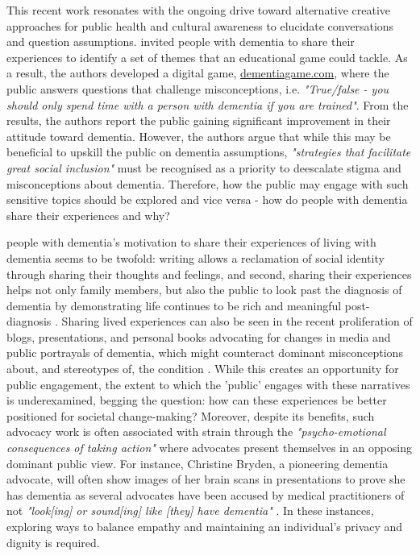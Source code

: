 This recent work resonates with the ongoing drive toward alternative creative approaches for public health and cultural awareness to elucidate conversations and question assumptions. \cite{carter2021effectiveness} invited people with dementia to share their experiences to identify a set of themes that an educational game could tackle. As a result, the authors developed a digital game, \href{https://www.dementiagame.com}{dementiagame.com}, where the public answers questions that challenge misconceptions, i.e. \textit{"True/false - you should only spend time with a person with dementia if you are trained"}. From the results, the authors report the public gaining significant improvement in their attitude toward dementia. However, the authors argue that while this may be beneficial to upskill the public on dementia assumptions, \textit{"strategies that facilitate great social inclusion"} must be recognised as a priority to deescalate stigma and misconceptions about dementia. Therefore, how the public may engage with such sensitive topics should be explored and vice versa - how do people with dementia share their experiences and why?

people with dementia's motivation to share their experiences of living with dementia seems to be twofold: writing allows a reclamation of social identity through sharing their thoughts and feelings, and second, sharing their experiences helps not only family members, but also the public to look past the diagnosis of dementia by demonstrating life continues to be rich and meaningful post-diagnosis \citep{ryan_dementia_2009}. Sharing lived experiences can also be seen in the recent proliferation of blogs, presentations, and personal books advocating for changes in media and public portrayals of dementia, which might counteract dominant misconceptions about, and stereotypes of, the condition \citep{christine_bryden_dancing_2005,bryden_challenging_2020}. While this creates an opportunity for public engagement, the extent to which the 'public' engages with these narratives is underexamined, begging the question: how can these experiences be better positioned for societal change-making? Moreover, despite its benefits, such advocacy work is often associated with strain through the \textit{"psycho-emotional consequences of taking action" }\citep{bartlett_citizenship_2014} where advocates present themselves in an opposing dominant public view. For instance, Christine Bryden, a pioneering dementia advocate, will often show images of her brain scans in presentations to prove she has dementia as several advocates have been accused by medical practitioners of not \textit{"look[ing] or sound[ing] like [they] have dementia"} \citep{swaffer_but_2016}. In these instances, exploring ways to balance empathy and maintaining an individual's privacy and dignity is required.

